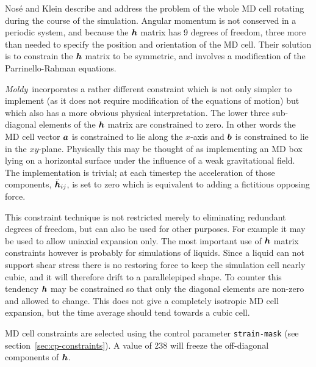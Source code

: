 \documentclass[twoside]{report}
\newcommand{\moldy}{{\em Moldy}}
\newcommand{\bm}[1]{\mbox{\boldmath \protect\(#1\protect\)}}
\begin{document}
Nos\'{e} and Klein\cite{nose:83} describe and address the problem of
the whole MD cell rotating during the course of the simulation.
Angular momentum is not conserved in a periodic system, and because
the $\bm{h}$ matrix has 9 degrees of freedom, three more than needed
to specify the position and orientation of the MD cell.  Their
solution is to constrain the $\bm{h}$ matrix to be symmetric, and
involves a modification of the Parrinello-Rahman equations.

\moldy\ incorporates a rather different constraint which is not only
simpler to implement (as it does not require modification of the
equations of motion) but which also has a more obvious physical
interpretation.  The lower three sub-diagonal elements of the $\bm{h}$
matrix are constrained to zero.  In other words the MD cell vector
$\bm{a}$ is constrained to lie along the $x$-axis and $\bm{b}$ is
constrained to lie in the $xy$-plane.  Physically this may be thought
of as implementing an MD box lying on a horizontal surface under the
influence of a weak gravitational field.  The implementation is
trivial; at each timestep the acceleration of those components,
$\ddot{\bm{h}}_{ij}$, is set to zero which is equivalent to adding a
fictitious opposing force.

This constraint technique is not restricted merely to eliminating
redundant degrees of freedom, but can also be used for other purposes.
For example it may be used to allow uniaxial expansion only.  The most
important use of $\bm{h}$ matrix constraints however is probably for
simulations of liquids.  Since a liquid can not support shear stress
there is no restoring force to keep the simulation cell nearly cubic,
and it will therefore drift to a parallelepiped shape.  To counter
this tendency $\bm{h}$ may be constrained so that only the diagonal
elements are non-zero and allowed to change.  This does not give a
completely isotropic MD cell expansion, but the time average should
tend towards a cubic cell.

MD cell constraints are selected using the control parameter
\texttt{strain-mask} (see section~\ref{sec:cp-constraints}).  A value of
238 will freeze the off-diagonal components of $\bm{h}$.

\end{document}
